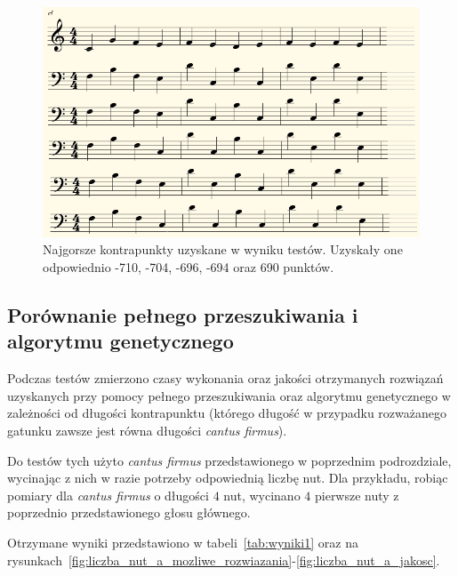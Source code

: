 \documentclass{article}
\begin{document}
\begin{figure}[htb]
\centering
\includegraphics[width=1.0\textwidth]{images/najgorsze_kontrapunkty.png}
\caption{Najgorsze kontrapunkty uzyskane w wyniku testów. Uzyskały one odpowiednio -710, -704, -696, -694 oraz 690 punktów.}
\label{fig:najgorsze_kontrapunkty}
\end{figure}

\subsection{Porównanie pełnego przeszukiwania i algorytmu genetycznego}

Podczas testów zmierzono czasy wykonania oraz jakości otrzymanych rozwiązań uzyskanych przy pomocy pełnego przeszukiwania oraz algorytmu genetycznego w zależności od długości kontrapunktu (którego długość w przypadku rozważanego gatunku zawsze jest równa długości \emph{cantus firmus}). 

Do testów tych użyto \emph{cantus firmus} przedstawionego w poprzednim podrozdziale, wycinając z nich w razie potrzeby odpowiednią liczbę nut. Dla przykładu, robiąc pomiary dla \emph{cantus firmus} o długości $4$ nut, wycinano $4$ pierwsze nuty z poprzednio przedstawionego głosu głównego.

Otrzymane wyniki przedstawiono w tabeli~\ref{tab:wyniki1} oraz na rysunkach~\ref{fig:liczba_nut_a_mozliwe_rozwiazania}-\ref{fig:liczba_nut_a_jakosc}.
\end{document}
